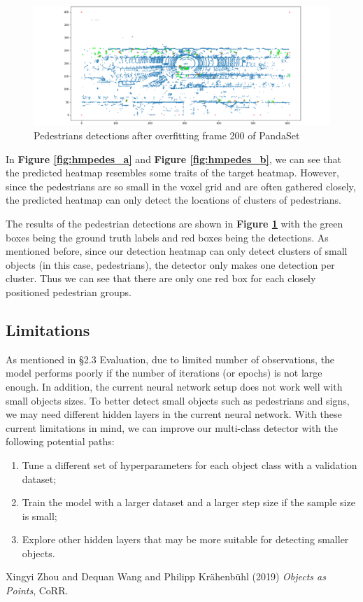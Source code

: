 \documentclass[letter]{article}
\newcommand{\fref}[1]{\textbf{Figure \ref{#1}}}
\begin{document}
	\begin{figure}[h]
		\centering
		\includegraphics[width=\linewidth]{images/det_overfit_pedes.png}
		\caption{Pedestrians detections after overfitting frame 200 of PandaSet}
		\label{fig:detpedes}
	\end{figure}

	In \fref{fig:hmpedes_a} and \fref{fig:hmpedes_b}, we can see that the predicted heatmap resembles some traits of the target heatmap. However, since the pedestrians are so small in the voxel grid and are often gathered closely, the predicted heatmap can only detect the locations of clusters of pedestrians. 

	The results of the pedestrian detections are shown in \fref{fig:detpedes} with the green boxes being the ground truth labels and red boxes being the detections. As mentioned before, since our detection heatmap can only detect clusters of small objects (in this case, pedestrians), the detector only makes one detection per cluster. Thus we can see that there are only one red box for each closely positioned pedestrian groups. 

	\subsection{Limitations}

	As mentioned in \S 2.3 Evaluation, due to limited number of observations, the model performs poorly if the number of iterations (or epochs) is not large enough. In addition, the current neural network setup does not work well with small objects sizes. To better detect small objects such as pedestrians and signs, we may need different hidden layers in the current neural network. With these current limitations in mind, we can improve our multi-class detector with the following potential paths: \begin{enumerate}
		\item Tune a different set of hyperparameters for each object class with a validation dataset;
		\item Train the model with a larger dataset and a larger step size if the sample size is small;
		\item Explore other hidden layers that may be more suitable for detecting smaller objects. 
	\end{enumerate}
	
	\begin{thebibliography}{9}
		Xingyi Zhou and Dequan Wang and Philipp Kr{\"{a}}henb{\"{u}}hl (2019) \emph{Objects as Points}, CoRR.
	\end{thebibliography}
\end{document}
